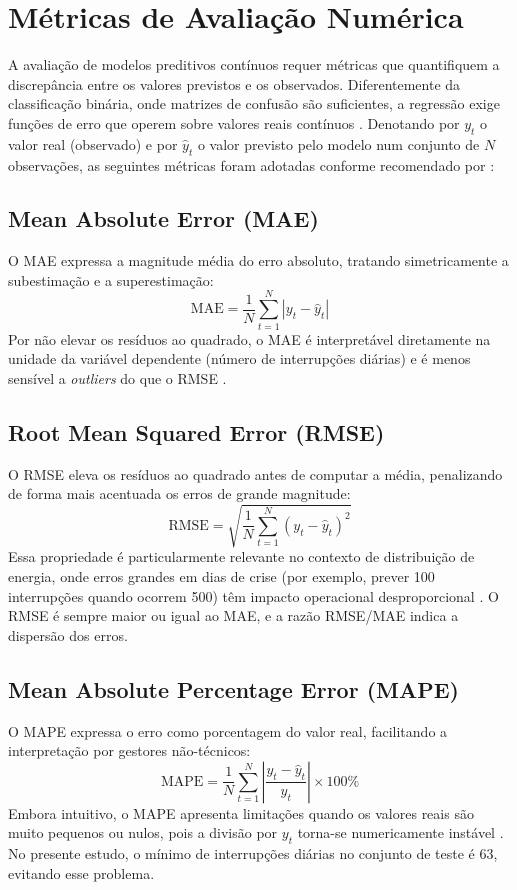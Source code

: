 \section{Métricas de Avaliação Numérica}\label{sec:metricas_avaliacao}
A avaliação de modelos preditivos contínuos requer métricas que quantifiquem a discrepância entre os valores previstos e os observados. Diferentemente da classificação binária, onde matrizes de confusão são suficientes, a regressão exige funções de erro que operem sobre valores reais contínuos \cite{goodfellow2016deep}. Denotando por $y_t$ o valor real (observado) e por $\hat{y}_t$ o valor previsto pelo modelo num conjunto de $N$ observações, as seguintes métricas foram adotadas conforme recomendado por \cite{hyndman2018forecasting}:

\subsection{Mean Absolute Error (MAE)}
O MAE expressa a magnitude média do erro absoluto, tratando simetricamente a subestimação e a superestimação:
\begin{equation}
    \text{MAE} = \frac{1}{N} \sum_{t=1}^N \left| y_t - \hat{y}_t \right|
\end{equation}
Por não elevar os resíduos ao quadrado, o MAE é interpretável diretamente na unidade da variável dependente (número de interrupções diárias) e é menos sensível a \textit{outliers} do que o RMSE \cite{box2015time}.

\subsection{Root Mean Squared Error (RMSE)}
O RMSE eleva os resíduos ao quadrado antes de computar a média, penalizando de forma mais acentuada os erros de grande magnitude:
\begin{equation}
    \text{RMSE} = \sqrt{\frac{1}{N} \sum_{t=1}^N (y_t - \hat{y}_t)^2}
\end{equation}
Essa propriedade é particularmente relevante no contexto de distribuição de energia, onde erros grandes em dias de crise (por exemplo, prever 100 interrupções quando ocorrem 500) têm impacto operacional desproporcional \cite{goodfellow2016deep}. O RMSE é sempre maior ou igual ao MAE, e a razão RMSE/MAE indica a dispersão dos erros.

\subsection{Mean Absolute Percentage Error (MAPE)}
O MAPE expressa o erro como porcentagem do valor real, facilitando a interpretação por gestores não-técnicos:
\begin{equation}
    \text{MAPE} = \frac{1}{N} \sum_{t=1}^N \left|\frac{y_t - \hat{y}_t}{y_t}\right| \times 100\%
\end{equation}
Embora intuitivo, o MAPE apresenta limitações quando os valores reais são muito pequenos ou nulos, pois a divisão por $y_t$ torna-se numericamente instável \cite{hyndman2018forecasting}. No presente estudo, o mínimo de interrupções diárias no conjunto de teste é 63, evitando esse problema.

